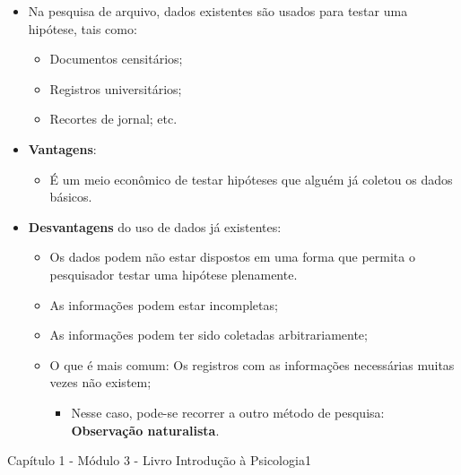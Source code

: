 \documentclass[
]{book}
\providecommand{\tightlist}{%
  \setlength{\itemsep}{0pt}\setlength{\parskip}{0pt}}
\begin{document}
\begin{itemize}
\tightlist
\item
  Na pesquisa de arquivo, dados existentes são usados para testar uma hipótese, tais como:

  \begin{itemize}
  \tightlist
  \item
    Documentos censitários;
  \item
    Registros universitários;
  \item
    Recortes de jornal; etc.
  \end{itemize}
\item
  \textbf{Vantagens}:

  \begin{itemize}
  \tightlist
  \item
    É um meio econômico de testar hipóteses que alguém já coletou os dados básicos.
  \end{itemize}
\item
  \textbf{Desvantagens} do uso de dados já existentes:

  \begin{itemize}
  \tightlist
  \item
    Os dados podem não estar dispostos em uma forma que permita o pesquisador testar uma hipótese plenamente.
  \item
    As informações podem estar incompletas;
  \item
    As informações podem ter sido coletadas arbitrariamente;
  \item
    O que é mais comum: Os registros com as informações necessárias muitas vezes não existem;

    \begin{itemize}
    \tightlist
    \item
      Nesse caso, pode-se recorrer a outro método de pesquisa: \textbf{Observação naturalista}.
    \end{itemize}
  \end{itemize}
\end{itemize}

Capítulo 1 - Módulo 3 - Livro Introdução à Psicologia1
\end{document}
